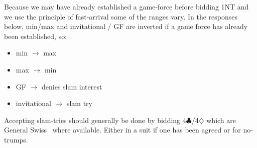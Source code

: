 \documentclass[a4paper,14pt]{extarticle}
\begin{document}
Because we may have already established a game-force before bidding 1NT and we
use the principle of fast-arrival some of the ranges vary. In the responses
below, min/max and invitational / GF are inverted if a game force has already
been established, so:

\begin{itemize}
\item min $\rightarrow$ max
\item max $\rightarrow$ min
\item GF $\rightarrow$ denies slam interest
\item invitational $\rightarrow$ slam try
\end{itemize}

Accepting slam-tries should generally be done by bidding
4$\clubsuit$/4$\diamondsuit$ which are General Swiss~ where
available. Either in a suit if one has been agreed or for no-trumps.
\end{document}
